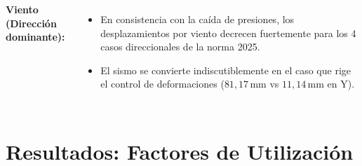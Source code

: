 \documentclass[11.5pt,aspectratio=169,handout]{beamer}
\begin{document}
\begin{frame}
\begin{columns}[T,totalwidth=\textwidth]
  \vspace{-1mm}
  {\footnotesize\textbf{Viento (Dirección dominante):}}\\[2mm]
  \\[3mm]
  \begin{itemize}\scriptsize\setlength{\itemsep}{2mm}
    \item En consistencia con la caída de presiones, los desplazamientos por viento decrecen fuertemente para los \alert{4 casos direccionales} de la norma 2025.
    \item El \alert{sismo} se convierte indiscutiblemente en el caso que rige el control de deformaciones ($81{,}17\,$mm vs $11{,}14\,$mm en Y).
  \end{itemize}
\end{columns}
\end{frame}

\section{Resultados: Factores de Utilización}
\end{document}
